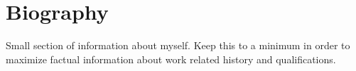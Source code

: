 \documentclass[../main.tex]{subfiles}
\begin{document}
\section{Biography}
Small section of information about myself. Keep this to a minimum in order to maximize factual information about work related history and qualifications. 
\end{document}

